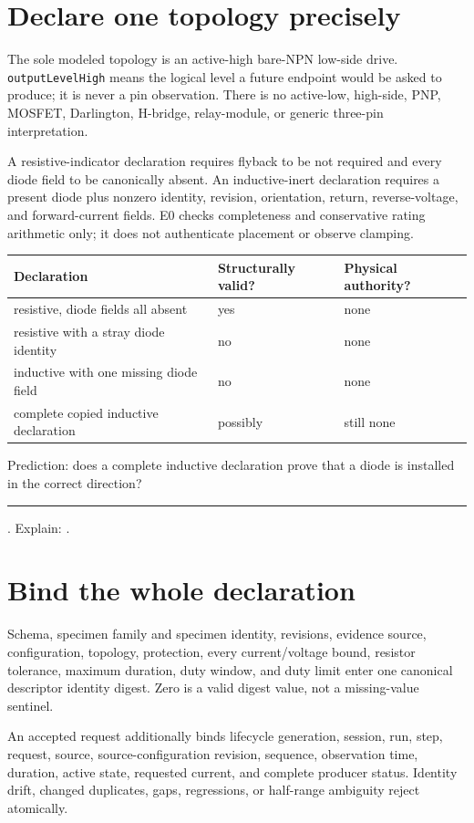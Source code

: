 \documentclass[10pt]{article}
\newcommand{\blankline}{\rule{0.80in}{0.4pt}}
\begin{document}
\newpage
\section{Declare one topology precisely}
The sole modeled topology is an active-high bare-NPN low-side drive.
\texttt{outputLevelHigh} means the logical level a future endpoint would be
asked to produce; it is never a pin observation. There is no active-low,
high-side, PNP, MOSFET, Darlington, H-bridge, relay-module, or generic
three-pin interpretation.

A resistive-indicator declaration requires flyback to be not required and
every diode field to be canonically absent. An inductive-inert declaration
requires a present diode plus nonzero identity, revision, orientation,
return, reverse-voltage, and forward-current fields. E0 checks completeness
and conservative rating arithmetic only; it does not authenticate placement
or observe clamping.

\begin{tabularx}{\linewidth}{@{}l X X@{}}
\toprule
Declaration & Structurally valid? & Physical authority?\\
\midrule
resistive, diode fields all absent & yes & none\\
resistive with a stray diode identity & no & none\\
inductive with one missing diode field & no & none\\
complete copied inductive declaration & possibly & still none\\
\bottomrule
\end{tabularx}

Prediction: does a complete inductive declaration prove that a diode is
installed in the correct direction? \blankline. Explain: \hrulefill.

\section{Bind the whole declaration}
Schema, specimen family and specimen identity, revisions, evidence source,
configuration, topology, protection, every current/voltage bound, resistor
tolerance, maximum duration, duty window, and duty limit enter one canonical
descriptor identity digest. Zero is a valid digest value, not a missing-value
sentinel.

An accepted request additionally binds lifecycle generation, session, run,
step, request, source, source-configuration revision, sequence, observation
time, duration, active state, requested current, and complete producer status.
Identity drift, changed duplicates, gaps, regressions, or half-range
ambiguity reject atomically.
\end{document}
